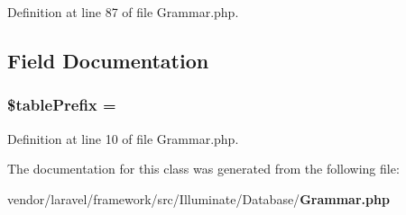 Definition at line 87 of file Grammar.\+php.



\subsection{Field Documentation}
\subsubsection[{\$table\+Prefix}]{\setlength{\rightskip}{0pt plus 5cm}\$table\+Prefix = \textquotesingle{}\textquotesingle{}\hspace{0.3cm}{\ttfamily [protected]}}\label{class_illuminate_1_1_database_1_1_grammar_a061ded67e1c12c266312830d080f46a7}


Definition at line 10 of file Grammar.\+php.



The documentation for this class was generated from the following file\+:\begin{DoxyCompactItemize}
\item 
vendor/laravel/framework/src/\+Illuminate/\+Database/{\bf Grammar.\+php}\end{DoxyCompactItemize}
